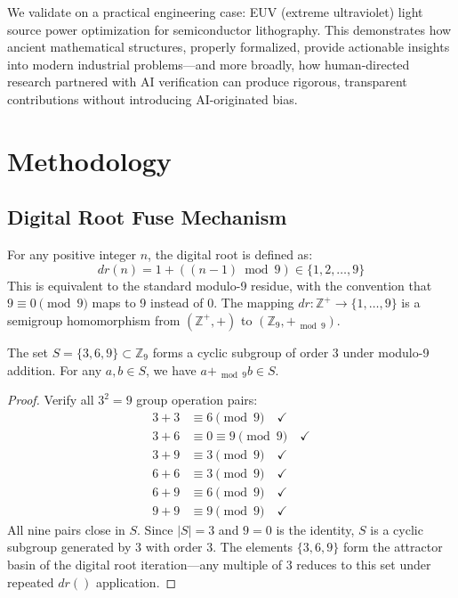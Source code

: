 \documentclass[twocolumn]{article}
\begin{document}
We validate on a practical engineering case: EUV (extreme ultraviolet) light source power optimization for semiconductor lithography. This demonstrates how ancient mathematical structures, properly formalized, provide actionable insights into modern industrial problems—and more broadly, how human-directed research partnered with AI verification can produce rigorous, transparent contributions without introducing AI-originated bias.

\section{Methodology}

\subsection{Digital Root Fuse Mechanism}

\begin{definition}
For any positive integer $n$, the digital root is defined as:
\[
  dr(n) = 1 + ((n-1) \bmod 9) \in \{1,2,\ldots,9\}
\]
This is equivalent to the standard modulo-9 residue, with the convention that $9 \equiv 0 \pmod{9}$ maps to 9 instead of 0. The mapping $dr: \mathbb{Z}^+ \to \{1,\ldots,9\}$ is a semigroup homomorphism from $(\mathbb{Z}^+, +)$ to $(\mathbb{Z}_9, +_{\bmod 9})$.
\end{definition}

\begin{theorem}
\label{thm:369closure}
The set $S = \{3, 6, 9\} \subset \mathbb{Z}_9$ forms a cyclic subgroup of order 3 under modulo-9 addition. For any $a, b \in S$, we have $a +_{\bmod 9} b \in S$.
\end{theorem}

\begin{proof}
Verify all $3^2 = 9$ group operation pairs:
\begin{align*}
3 + 3 &\equiv 6 \pmod{9} \quad \checkmark \\
3 + 6 &\equiv 0 \equiv 9 \pmod{9} \quad \checkmark \\
3 + 9 &\equiv 3 \pmod{9} \quad \checkmark \\
6 + 6 &\equiv 3 \pmod{9} \quad \checkmark \\
6 + 9 &\equiv 6 \pmod{9} \quad \checkmark \\
9 + 9 &\equiv 9 \pmod{9} \quad \checkmark
\end{align*}
All nine pairs close in $S$. Since $|S| = 3$ and $9 = 0$ is the identity, $S$ is a cyclic subgroup generated by 3 with order 3. The elements $\{3, 6, 9\}$ form the attractor basin of the digital root iteration—any multiple of 3 reduces to this set under repeated $dr()$ application.
\end{proof}
\end{document}
